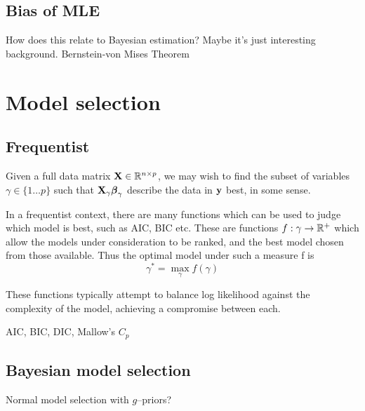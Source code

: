 \documentclass{amsart}[12pt]
\newcommand{\mgc}[1]{{\color{blue}#1}}
\begin{document}
\subsection{Bias of MLE}

How does this relate to Bayesian estimation? Maybe it's just interesting background.
Bernstein-von Mises Theorem

\section{Model selection}

\subsection{Frequentist}

Given a full data matrix ${\bf X} \in {\mathbb{R}}^{n \times p}$, we may wish to find the subset of variables $\gamma \in \{
1 \ldots p \}$ such that ${\bf X}_\gamma {\boldsymbol\beta}_\gamma$ describe the data in ${\bf y}$ best, in some sense.

In a frequentist context, there are many functions which can be used to judge which model is best,
such as AIC, BIC etc. These are functions $f: \gamma \to {\mathbb{R}}^+$ which allow the models under consideration to
be ranked, and the best model chosen from those available. Thus the optimal model under such a measure
f is
$$
\gamma^* = \max_\gamma f(\gamma)
$$

These functions typically attempt to balance log likelihood against the complexity of the model, achieving
a compromise between each.

\mgc{AIC, BIC, DIC, Mallow's $C_p$}

\subsection{Bayesian model selection}

\mgc{Normal model selection with $g$--priors?}


% 

\end{document}
